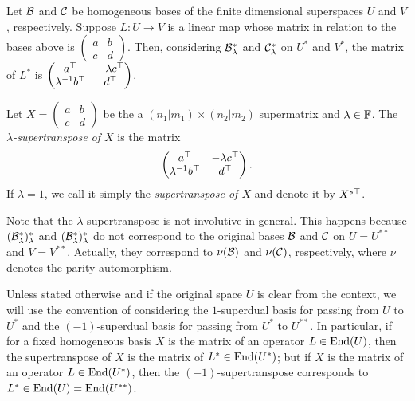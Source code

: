 \documentclass{amsbook}
\begin{document}
Let $\mathcal B$ and $\mathcal C$ be homogeneous bases of the finite dimensional superspaces $U$ and $V$, respectively. Suppose $L: U \to V$ is a linear map whose matrix in relation to the bases above is
$\begin{pmatrix}
        a & b\\
        c & d
    \end{pmatrix}$.
Then, considering $\mathcal B^*_\lambda$ and $\mathcal C^*_\lambda$ on $U^*$ and $V^*$, the matrix of $L^*$ is
$\begin{pmatrix}
        a^{\top} & -\lambda c^{\top}\\
        \lambda^{-1} b^{\top} & d^{\top}
    \end{pmatrix}$.
    
\begin{defi}
    Let $X = \begin{pmatrix}
        a & b\\
        c & d
    \end{pmatrix}$ be the a $(n_1 | m_1)\times (n_2 | m_2)$ supermatrix and $\lambda \in \mathbb{F}$. The \emph{$\lambda$-supertranspose of $X$} is the matrix
    \[
    \begin{pmatrix}
        a^{\top} & -\lambda c^{\top}\\
        \lambda^{-1} b^{\top} & d^{\top}
    \end{pmatrix}. 
    \]
    If $\lambda = 1$, we call it simply the \emph{supertranspose of $X$} and denote it by $X^{s\top}$.
\end{defi}

Note that the $\lambda$-supertranspose is not involutive in general. This happens because $(\mathcal B^*_\lambda)^*_\lambda$ and $(\mathcal B^*_\lambda)^*_\lambda$ do not correspond to the original bases $\mathcal B$ and $\mathcal C$ on $U = U^{**}$ and $V=V^{**}$. Actually, they correspond to $\nu (\mathcal B)$ and $\nu (\mathcal C)$, respectively, where $\nu$ denotes the parity automorphism.

\begin{remark}\label{rmk:which-supertranspose-to-use}
    Unless stated otherwise and if the original space $U$ is clear from the context, we will use the convention of considering the $1$-superdual basis for passing from $U$ to $U^*$ and the $(-1)$-superdual basis for passing from $U^*$ to $U^{**}$. In particular, if for a fixed homogeneous basis $X$ is the matrix of an operator $L \in \operatorname{End}(U)$, then the supertranspose of $X$ is the matrix of $L^* \in \operatorname{End}(U^*)$; but if $X$ is the matrix of an operator $L\in \operatorname{End}(U^*)$, then the $(-1)$-supertranspose corresponds to $L^* \in \operatorname{End}(U) = \operatorname{End}(U^{**})$.
\end{remark}
\end{document}

